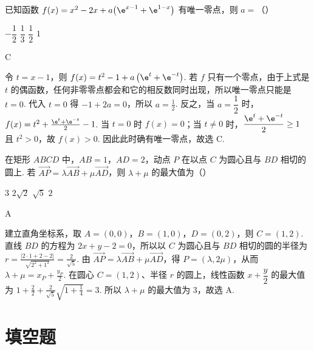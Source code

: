 \begin{problem}
已知函数 \(f(x)=x^2-2x+a\bigl(\e^{x-1}+\e^{1-x}\bigr)\) 有唯一零点，则 \(a=\)（\quad）

\choices
    {\(-\dfrac{1}{2}\)}
    {\(\dfrac{1}{3}\)}
    {\(\dfrac{1}{2}\)}
    {\(1\)}
\end{problem}

\begin{answer}
C
\end{answer}

\begin{solution}
令 \(t=x-1\)，则 \(f(x)=t^2-1+a\left(\e^t+\e^{-t}\right)\).
若 \(f\) 只有一个零点，由于上式是 \(t\) 的偶函数，任何非零零点都会和它的相反数同时出现，所以唯一零点只能是 \(t=0\). 代入 \(t=0\) 得 \(-1+2a=0\)，所以 \(a=\frac12\).
反之，当 \(a=\dfrac12\) 时，\(f(x)=t^2+\frac{\e^t+\e^{-t}}2-1\).
当 \(t=0\) 时 \(f(x)=0\)；当 \(t\ne0\) 时，\(\dfrac{\e^t+\e^{-t}}2\ge1\) 且 \(t^2>0\)，故 \(f(x)>0\). 因此此时确有唯一零点，故选 C.
\end{solution}

\begin{problem}
在矩形 \(ABCD\) 中，\(AB=1\)，\(AD=2\)，动点 \(P\) 在以点 \(C\) 为圆心且与 \(BD\) 相切的圆上. 若 \(\overrightarrow{AP}=\lambda\overrightarrow{AB}+\mu\overrightarrow{AD}\)，则 \(\lambda+\mu\) 的最大值为（\quad）

\choices
    {\(3\)}
    {\(2\sqrt2\)}
    {\(\sqrt5\)}
    {\(2\)}
\end{problem}

\begin{answer}
A
\end{answer}

\begin{solution}
建立直角坐标系，取 \(A=(0,0)\)，\(B=(1,0)\)，\(D=(0,2)\)，则 \(C=(1,2)\). 直线 \(BD\) 的方程为 \(2x+y-2=0\)，所以以 \(C\) 为圆心且与 \(BD\) 相切的圆的半径为 \(r=\frac{|2\cdot1+2-2|}{\sqrt{2^2+1^2}}=\frac2{\sqrt5}\). 由 \(\overrightarrow{AP}=\lambda\overrightarrow{AB}+\mu\overrightarrow{AD}\)，得 \(P=(\lambda,2\mu)\)，从而 \(\lambda+\mu=x_P+\frac{y_P}{2}\).
在圆心 \(C=(1,2)\)、半径 \(r\) 的圆上，线性函数 \(x+\dfrac y2\) 的最大值为 \(1+\frac22+\frac2{\sqrt5}\sqrt{1+\frac14}=3\).
所以 \(\lambda+\mu\) 的最大值为 \(3\)，故选 A.
\end{solution}

\section{填空题}

